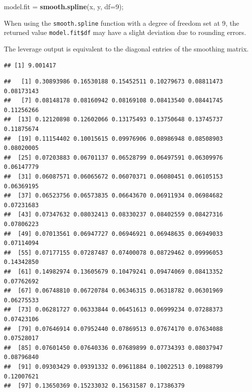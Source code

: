 \documentclass[
]{book}
\newenvironment{Shaded}{\begin{snugshade}}{\end{snugshade}}
\newcommand{\AttributeTok}[1]{\textcolor[rgb]{0.13,0.29,0.53}{#1}}
\newcommand{\CommentTok}[1]{\textcolor[rgb]{0.56,0.35,0.01}{\textit{#1}}}
\newcommand{\DecValTok}[1]{\textcolor[rgb]{0.00,0.00,0.81}{#1}}
\newcommand{\FunctionTok}[1]{\textcolor[rgb]{0.13,0.29,0.53}{\textbf{#1}}}
\newcommand{\NormalTok}[1]{#1}
\newcommand{\OtherTok}[1]{\textcolor[rgb]{0.56,0.35,0.01}{#1}}
\newcommand{\SpecialCharTok}[1]{\textcolor[rgb]{0.81,0.36,0.00}{\textbf{#1}}}
\begin{document}
\begin{Shaded}
\begin{Highlighting}[]
\NormalTok{model.fit }\OtherTok{=} \FunctionTok{smooth.spline}\NormalTok{(x, y, }\AttributeTok{df=}\DecValTok{9}\NormalTok{);}
\end{Highlighting}
\end{Shaded}

When using the \texttt{smooth.spline} function with a degree of freedom set at 9, the returned value \texttt{model.fit\$df} may have a slight deviation due to rounding errors.

The leverage output is equivalent to the diagonal entries of the smoothing matrix.

\begin{Shaded}
\end{Shaded}

\begin{verbatim}
## [1] 9.001417
\end{verbatim}

\begin{Shaded}
\end{Shaded}

\begin{verbatim}
##   [1] 0.30893986 0.16530188 0.15452511 0.10279673 0.08811473 0.08173143
##   [7] 0.08148178 0.08160942 0.08169108 0.08413540 0.08441745 0.11256266
##  [13] 0.12120898 0.12602066 0.13175493 0.13750648 0.13745737 0.11875674
##  [19] 0.11154402 0.10015615 0.09976906 0.08986948 0.08508903 0.08020005
##  [25] 0.07203883 0.06701137 0.06528799 0.06497591 0.06309976 0.06147779
##  [31] 0.06087571 0.06065672 0.06070371 0.06080451 0.06105153 0.06369195
##  [37] 0.06523756 0.06573835 0.06643670 0.06911934 0.06984682 0.07231683
##  [43] 0.07347632 0.08032413 0.08330237 0.08402559 0.08427316 0.07806223
##  [49] 0.07013561 0.06947727 0.06946921 0.06948635 0.06949033 0.07114094
##  [55] 0.07177155 0.07287487 0.07400078 0.08729462 0.09996053 0.14342850
##  [61] 0.14982974 0.13605679 0.10479241 0.09474069 0.08413352 0.07762692
##  [67] 0.06748810 0.06720784 0.06346315 0.06318782 0.06301969 0.06275533
##  [73] 0.06281727 0.06333844 0.06451613 0.06999234 0.07288373 0.07423106
##  [79] 0.07646914 0.07952440 0.07869513 0.07674170 0.07634088 0.07528017
##  [85] 0.07601450 0.07640336 0.07689899 0.07734393 0.08037947 0.08796840
##  [91] 0.09303429 0.09391332 0.09611884 0.10022513 0.10988799 0.12007621
##  [97] 0.13650369 0.15233032 0.15631587 0.17386379
\end{verbatim}
\end{document}
